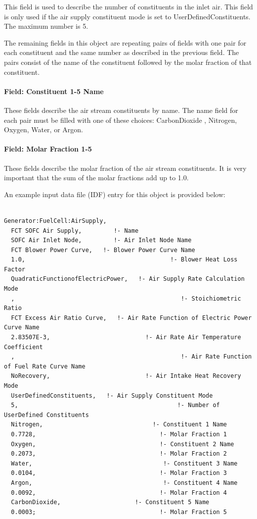 This field is used to describe the number of constituents in the inlet air. This field is only used if the air supply constituent mode is set to UserDefinedConstituents. The maximum number is 5.

The remaining fields in this object are repeating pairs of fields with one pair for each constituent and the same number as described in the previous field. The pairs consist of the name of the constituent followed by the molar fraction of that constituent.

\paragraph{Field: Constituent 1-5 Name}\label{field-constituent-1-5-name}

These fields describe the air stream constituents by name. The name field for each pair must be filled with one of these choices: CarbonDioxide , Nitrogen, Oxygen, Water, or Argon.

\paragraph{Field: Molar Fraction 1-5}\label{field-molar-fraction-1-5}

These fields describe the molar fraction of the air stream constituents. It is very important that the sum of the molar fractions add up to 1.0.

An example input data file (IDF) entry for this object is provided below:

\begin{lstlisting}

Generator:FuelCell:AirSupply,
  FCT SOFC Air Supply,         !- Name
  SOFC Air Inlet Node,         !- Air Inlet Node Name
  FCT Blower Power Curve,   !- Blower Power Curve Name
  1.0,                                         !- Blower Heat Loss Factor
  QuadraticFunctionofElectricPower,   !- Air Supply Rate Calculation Mode
  ,                                               !- Stoichiometric Ratio
  FCT Excess Air Ratio Curve,   !- Air Rate Function of Electric Power Curve Name
  2.83507E-3,                           !- Air Rate Air Temperature Coefficient
  ,                                               !- Air Rate Function of Fuel Rate Curve Name
  NoRecovery,                           !- Air Intake Heat Recovery Mode
  UserDefinedConstituents,   !- Air Supply Constituent Mode
  5,                                             !- Number of UserDefined Constituents
  Nitrogen,                               !- Constituent 1 Name
  0.7728,                                   !- Molar Fraction 1
  Oxygen,                                   !- Constituent 2 Name
  0.2073,                                   !- Molar Fraction 2
  Water,                                     !- Constituent 3 Name
  0.0104,                                   !- Molar Fraction 3
  Argon,                                     !- Constituent 4 Name
  0.0092,                                   !- Molar Fraction 4
  CarbonDioxide,                     !- Constituent 5 Name
  0.0003;                                   !- Molar Fraction 5
\end{lstlisting}

